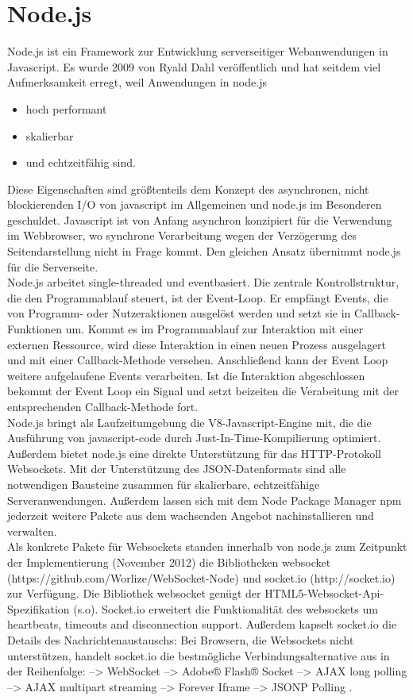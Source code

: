 \section{Node.js}\label{Node.js}
Node.js ist ein Framework zur Entwicklung serverseitiger Webanwendungen in Javascript. Es wurde 2009 von Ryald Dahl veröffentlich und hat seitdem viel Aufmerksamkeit erregt, weil Anwendungen in node.js
\begin{itemize}

\item hoch performant
\item skalierbar
\item und echtzeitfähig sind.
\end{itemize}
Diese Eigenschaften sind größtenteils dem Konzept des asynchronen, nicht blockierenden I/O von javascript im Allgemeinen und node.js im Besonderen geschuldet.
Javascript ist von Anfang asynchron konzipiert für die Verwendung im Webbrowser, wo synchrone Verarbeitung wegen der Verzögerung des Seitendarstellung nicht in Frage kommt. Den gleichen Ansatz übernimmt node.js für die Serverseite.
\\
Node.js arbeitet single-threaded und eventbasiert. Die zentrale Kontrollstruktur, die den Programmablauf steuert, ist der Event-Loop. Er empfängt Events, die von Programm- oder Nutzeraktionen ausgelöst werden und setzt sie in Callback-Funktionen um.
Kommt es im Programmablauf zur Interaktion mit einer externen Ressource, wird diese Interaktion in einen neuen Prozess ausgelagert und mit einer Callback-Methode versehen. Anschließend kann der Event Loop weitere aufgelaufene Events verarbeiten. Ist die Interaktion abgeschlossen bekommt der Event Loop ein Signal und setzt beizeiten die Verabeitung mit der entsprechenden Callback-Methode  fort.\\
Node.js bringt als Laufzeitumgebung die V8-Javascript-Engine mit, die die Ausführung von javascript-code durch Just-In-Time-Kompilierung optimiert. Außerdem bietet node.js eine direkte Unterstützung für das HTTP-Protokoll Websockets. Mit der Unterstützung des JSON-Datenformats sind alle notwendigen Bausteine zusammen für skalierbare, echtzeitfähige Serveranwendungen.
Außerdem lassen sich mit dem Node Package Manager npm jederzeit weitere Pakete aus dem wachsenden Angebot nachinstallieren und verwalten.\\
Als konkrete Pakete für Websockets standen innerhalb von node.js zum Zeitpunkt der Implementierung (November 2012) die Bibliotheken websocket (https://github.com/Worlize/WebSocket-Node) und socket.io (http://socket.io) zur Verfügung. Die Bibliothek websocket genügt der HTML5-Websocket-Api-Spezifikation (s.o). Socket.io erweitert die Funktionalität des websockets um heartbeats, timeouts and disconnection support. Außerdem kapselt socket.io die Details des Nachrichtenaustauschs: Bei Browsern, die Websockets nicht unterstützen, handelt socket.io die bestmögliche Verbindungsalternative aus in der Reihenfolge: 
-->    WebSocket 
 -->   Adobe® Flash® Socket
  -->  AJAX long polling
   --> AJAX multipart streaming
 -->   Forever Iframe
 -->   JSONP Polling
.


